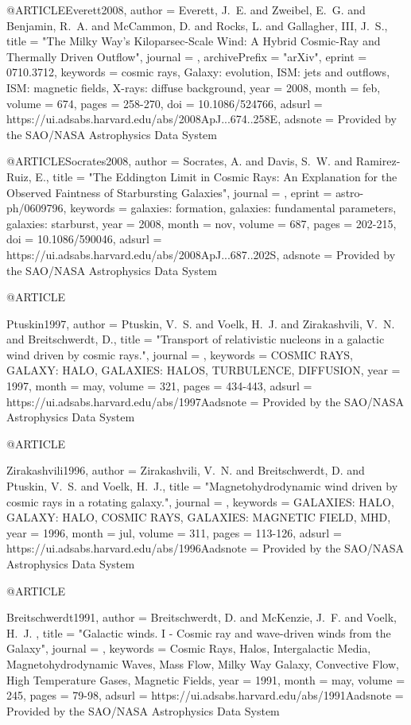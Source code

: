 \documentclass[useAMS,usenatbib]{mnras}
\begin{document}
{{{{{{{{{@ARTICLE{Everett2008,
   author = {{Everett}, J.~E. and {Zweibel}, E.~G. and {Benjamin}, R.~A. and 
	{McCammon}, D. and {Rocks}, L. and {Gallagher}, III, J.~S.},
    title = "{The Milky Way's Kiloparsec-Scale Wind: A Hybrid Cosmic-Ray and Thermally Driven Outflow}",
  journal = {\apj},
archivePrefix = "arXiv",
   eprint = {0710.3712},
 keywords = {cosmic rays, Galaxy: evolution, ISM: jets and outflows, ISM: magnetic fields, X-rays: diffuse background},
     year = 2008,
    month = feb,
   volume = 674,
    pages = {258-270},
      doi = {10.1086/524766},
   adsurl = {https://ui.adsabs.harvard.edu/abs/2008ApJ...674..258E},
  adsnote = {Provided by the SAO/NASA Astrophysics Data System}
}

@ARTICLE{Socrates2008,
   author = {{Socrates}, A. and {Davis}, S.~W. and {Ramirez-Ruiz}, E.},
    title = "{The Eddington Limit in Cosmic Rays: An Explanation for the Observed Faintness of Starbursting Galaxies}",
  journal = {\apj},
   eprint = {astro-ph/0609796},
 keywords = {galaxies: formation, galaxies: fundamental parameters, galaxies: starburst},
     year = 2008,
    month = nov,
   volume = 687,
    pages = {202-215},
      doi = {10.1086/590046},
   adsurl = {https://ui.adsabs.harvard.edu/abs/2008ApJ...687..202S},
  adsnote = {Provided by the SAO/NASA Astrophysics Data System}
}

@ARTICLE{Ptuskin1997,
   author = {{Ptuskin}, V.~S. and {Voelk}, H.~J. and {Zirakashvili}, V.~N. and 
	{Breitschwerdt}, D.},
    title = "{Transport of relativistic nucleons in a galactic wind driven by cosmic rays.}",
  journal = {\aap},
 keywords = {COSMIC RAYS, GALAXY: HALO, GALAXIES: HALOS, TURBULENCE, DIFFUSION},
     year = 1997,
    month = may,
   volume = 321,
    pages = {434-443},
   adsurl = {https://ui.adsabs.harvard.edu/abs/1997Aadsnote = {Provided by the SAO/NASA Astrophysics Data System}
}

@ARTICLE{Zirakashvili1996,
   author = {{Zirakashvili}, V.~N. and {Breitschwerdt}, D. and {Ptuskin}, V.~S. and 
	{Voelk}, H.~J.},
    title = "{Magnetohydrodynamic wind driven by cosmic rays in a rotating galaxy.}",
  journal = {\aap},
 keywords = {GALAXIES: HALO, GALAXY: HALO, COSMIC RAYS, GALAXIES: MAGNETIC FIELD, MHD},
     year = 1996,
    month = jul,
   volume = 311,
    pages = {113-126},
   adsurl = {https://ui.adsabs.harvard.edu/abs/1996Aadsnote = {Provided by the SAO/NASA Astrophysics Data System}
}


@ARTICLE{Breitschwerdt1991,
   author = {{Breitschwerdt}, D. and {McKenzie}, J.~F. and {Voelk}, H.~J.
	},
    title = "{Galactic winds. I - Cosmic ray and wave-driven winds from the Galaxy}",
  journal = {\aap},
 keywords = {Cosmic Rays, Halos, Intergalactic Media, Magnetohydrodynamic Waves, Mass Flow, Milky Way Galaxy, Convective Flow, High Temperature Gases, Magnetic Fields},
     year = 1991,
    month = may,
   volume = 245,
    pages = {79-98},
   adsurl = {https://ui.adsabs.harvard.edu/abs/1991Aadsnote = {Provided by the SAO/NASA Astrophysics Data System}
}

}}}}}}}}}}}}
\end{document}
